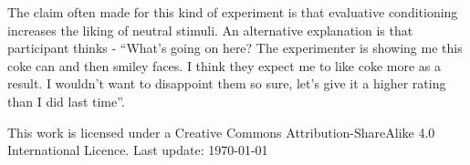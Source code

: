 \documentclass[12pt]{article}
\begin{document}
The claim often made for this kind of experiment is that evaluative
conditioning increases the liking of neutral stimuli. An alternative
explanation is that participant thinks - ``What's going on here? The
experimenter is showing me this coke can and then smiley faces. I
think they expect me to like coke more as a result. I wouldn't want to
disappoint them so sure, let's give it a higher rating than I did last
time''.

\vspace{12pt}

\tiny This work is licensed under a Creative Commons
Attribution-ShareAlike 4.0 International Licence. Last
update: \today
\end{document}
